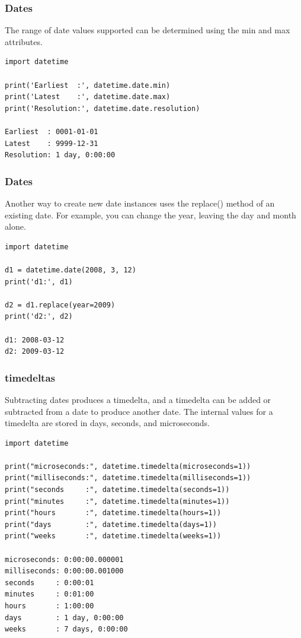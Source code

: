 \begin{frame}[fragile]\frametitle{Dates}
The range of date values supported can be determined using the min and max attributes.
\begin{lstlisting}
import datetime

print('Earliest  :', datetime.date.min)
print('Latest    :', datetime.date.max)
print('Resolution:', datetime.date.resolution)

Earliest  : 0001-01-01
Latest    : 9999-12-31
Resolution: 1 day, 0:00:00
\end{lstlisting}
\end{frame}

\begin{frame}[fragile]\frametitle{Dates}
Another way to create new date instances uses the replace() method of an existing date. For example, you can change the year, leaving the day and month alone.
\begin{lstlisting}
import datetime

d1 = datetime.date(2008, 3, 12)
print('d1:', d1)

d2 = d1.replace(year=2009)
print('d2:', d2)

d1: 2008-03-12
d2: 2009-03-12
\end{lstlisting}
\end{frame}

\begin{frame}[fragile]\frametitle{timedeltas}
Subtracting dates produces a timedelta, and a timedelta can be added or subtracted from a date to produce another date. The internal values for a timedelta are stored in days, seconds, and microseconds.
\begin{lstlisting}
import datetime

print("microseconds:", datetime.timedelta(microseconds=1))
print("milliseconds:", datetime.timedelta(milliseconds=1))
print("seconds     :", datetime.timedelta(seconds=1))
print("minutes     :", datetime.timedelta(minutes=1))
print("hours       :", datetime.timedelta(hours=1))
print("days        :", datetime.timedelta(days=1))
print("weeks       :", datetime.timedelta(weeks=1))

microseconds: 0:00:00.000001
milliseconds: 0:00:00.001000
seconds     : 0:00:01
minutes     : 0:01:00
hours       : 1:00:00
days        : 1 day, 0:00:00
weeks       : 7 days, 0:00:00
\end{lstlisting}
\end{frame}

